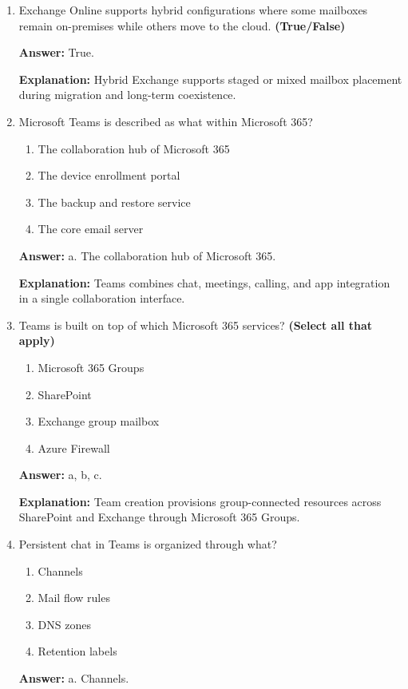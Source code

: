 \documentclass[10pt]{article}
\begin{document}
\begin{enumerate}[leftmargin=*]
\textbf{Explanation:} Mail flow rules examine message content and headers to enforce security and compliance actions.

\item Exchange Online supports hybrid configurations where some mailboxes remain on-premises while others move to the cloud. \textbf{(True/False)}

\textbf{Answer:} True.

\textbf{Explanation:} Hybrid Exchange supports staged or mixed mailbox placement during migration and long-term coexistence.

\item Microsoft Teams is described as what within Microsoft 365?
\begin{enumerate}[label=\alph*., leftmargin=1.5em]
\item The collaboration hub of Microsoft 365
\item The device enrollment portal
\item The backup and restore service
\item The core email server
\end{enumerate}
\textbf{Answer:} a. The collaboration hub of Microsoft 365.

\textbf{Explanation:} Teams combines chat, meetings, calling, and app integration in a single collaboration interface.

\item Teams is built on top of which Microsoft 365 services? \textbf{(Select all that apply)}
\begin{enumerate}[label=\alph*., leftmargin=1.5em]
\item Microsoft 365 Groups
\item SharePoint
\item Exchange group mailbox
\item Azure Firewall
\end{enumerate}
\textbf{Answer:} a, b, c.

\textbf{Explanation:} Team creation provisions group-connected resources across SharePoint and Exchange through Microsoft 365 Groups.

\item Persistent chat in Teams is organized through what?
\begin{enumerate}[label=\alph*., leftmargin=1.5em]
\item Channels
\item Mail flow rules
\item DNS zones
\item Retention labels
\end{enumerate}
\textbf{Answer:} a. Channels.


\end{enumerate}
\end{document}
